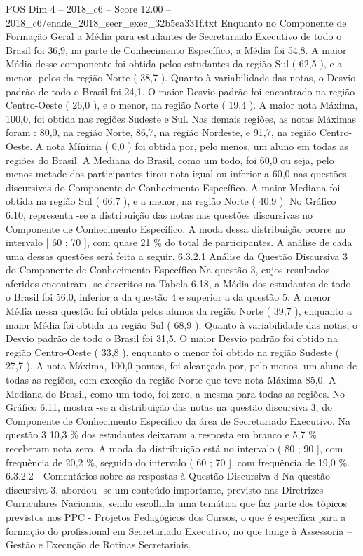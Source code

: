 \begin{textsample}{POS Dim 4 – 2018\_c6 – Score 12.00 – 2018\_c6/enade\_2018\_secr\_exec\_32b5ea331f.txt}
Enquanto no Componente de Formação Geral a Média para estudantes de Secretariado Executivo de todo o Brasil foi 36,9, na parte de Conhecimento Específico, a Média foi 54,8.
A maior Média desse componente foi obtida pelos estudantes da região Sul ( 62,5 ), e a menor, pelos da região Norte ( 38,7 ).
Quanto à variabilidade das notas, o Desvio padrão de todo o Brasil foi 24,1.
O maior Desvio padrão foi encontrado na região Centro-Oeste ( 26,0 ), e o menor, na região Norte ( 19,4 ).
A maior nota Máxima, 100,0, foi obtida nas regiões Sudeste e Sul.
Nas demais regiões, as notas Máximas foram : 80,0, na região Norte, 86,7, na região Nordeste, e 91,7, na região Centro-Oeste.
A nota Mínima ( 0,0 ) foi obtida por, pelo menos, um aluno em todas as regiões do Brasil.
A Mediana do Brasil, como um todo, foi 60,0 ou seja, pelo menos metade dos participantes tirou nota igual ou inferior a 60,0 nas questões discursivas do Componente de Conhecimento Específico.
A maior Mediana foi obtida na região Sul ( 66,7 ), e a menor, na região Norte ( 40,9 ).
No Gráfico 6.10, representa -se a distribuição das notas nas questões discursivas no Componente de Conhecimento Específico.
A moda dessa distribuição ocorre no intervalo [ 60 ; 70 ], com quase 21 \% do total de participantes.
A análise de cada uma dessas questões será feita a seguir. 6.3.2.1 Análise da Questão Discursiva 3 do Componente de Conhecimento Específico Na questão 3, cujos resultados aferidos encontram -se descritos na Tabela 6.18, a Média dos estudantes de todo o Brasil foi 56,0, inferior a da questão 4 e superior a da questão 5.
A menor Média nessa questão foi obtida pelos alunos da região Norte ( 39,7 ), enquanto a maior Média foi obtida na região Sul ( 68,9 ).
Quanto à variabilidade das notas, o Desvio padrão de todo o Brasil foi 31,5.
O maior Desvio padrão foi obtido na região Centro-Oeste ( 33,8 ), enquanto o menor foi obtido na região Sudeste ( 27,7 ).
A nota Máxima, 100,0 pontos, foi alcançada por, pelo menos, um aluno de todas as regiões, com exceção da região Norte que teve nota Máxima 85,0.
A Mediana do Brasil, como um todo, foi zero, a mesma para todas as regiões.
No Gráfico 6.11, mostra -se a distribuição das notas na questão discursiva 3, do Componente de Conhecimento Específico da área de Secretariado Executivo.
Na questão 3 10,3 \% dos estudantes deixaram a resposta em branco e 5,7 \% receberam nota zero.
A moda da distribuição está no intervalo ( 80 ; 90 ], com frequência de 20,2 \%, seguido do intervalo ( 60 ; 70 ], com frequência de 19,0 \%. 6.3.2.2 - Comentários sobre as respostas à Questão Discursiva 3 Na questão discursiva 3, abordou -se um conteúdo importante, previsto nas Diretrizes Curriculares Nacionais, sendo escolhida uma temática que faz parte dos tópicos previstos nos PPC - Projetos Pedagógicos dos Cursos, o que é específica para a formação do profissional em Secretariado Executivo, no que tange à Assessoria – Gestão e Execução de Rotinas Secretariais.

\end{textsample}
